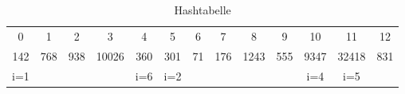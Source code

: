 \begin{table*}[ht]
  \centering
  \begin{tabular}{|c|c|c|c|c| c|c|c|c|c| c|c|c|}
    0   & 1   & 2   & 3     & 4   & 5   & 6  & 7   & 8    & 9   & 10   & 11    & 12  \\
    142 & 768 & 938 & 10026 & 360 & 301 & 71 & 176 & 1243 & 555 & 9347 & 32418 & 831 \\
    i=1 &     &     &       & i=6 & i=2 &    &     &      &     & i=4  & i=5   &     \\
  \end{tabular}

  \caption{Hashtabelle}\label{tbl:hashtable}
\end{table*}